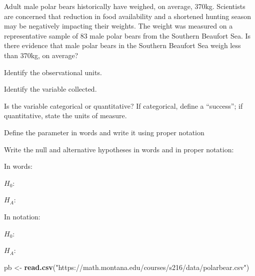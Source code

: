 \documentclass[
]{report}
\newenvironment{Shaded}{\begin{snugshade}}{\end{snugshade}}
\newcommand{\FunctionTok}[1]{\textcolor[rgb]{0.13,0.29,0.53}{\textbf{#1}}}
\newcommand{\NormalTok}[1]{#1}
\newcommand{\OtherTok}[1]{\textcolor[rgb]{0.56,0.35,0.01}{#1}}
\newcommand{\StringTok}[1]{\textcolor[rgb]{0.31,0.60,0.02}{#1}}
\newcommand{\rgi}{\hspace{24pt}}  %
\begin{document}
Adult male polar bears historically have weighed, on average, 370kg. Scientists are concerned that reduction in food availability and a shortened hunting season may be negatively impacting their weights. The weight was measured on a representative sample of 83 male polar bears from the Southern Beaufort Sea. Is there evidence that male polar bears in the Southern Beaufort Sea weigh less than 370kg, on average?

Identify the observational units.

\vspace{0.3in}

Identify the variable collected.

\vspace{0.3in}

Is the variable categorical or quantitative? If categorical, define a ``success''; if quantitative, state the units of measure.

\vspace{0.3in}

Define the parameter in words and write it using proper notation

\vspace{0.5in}

Write the null and alternative hypotheses in words and in proper notation:

\rgi In words:

\rgi \rgi \(H_0:\)

\vspace{0.45in}

\rgi \rgi \(H_A:\)

\vspace{0.45in}

\rgi In notation:

\vspace{1mm}

\rgi \rgi \(H_0:\)

\vspace{0.2in}

\rgi \rgi \(H_A:\)

\vspace{0.2in}

\begin{Shaded}
\begin{Highlighting}[]
\NormalTok{pb }\OtherTok{\textless{}{-}} \FunctionTok{read.csv}\NormalTok{(}\StringTok{"https://math.montana.edu/courses/s216/data/polarbear.csv"}\NormalTok{)}
\end{Highlighting}
\end{Shaded}
\end{document}
